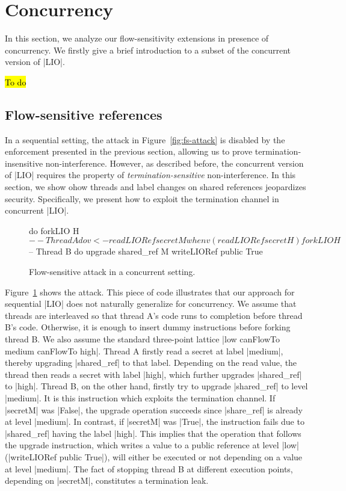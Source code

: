 \section{Concurrency}

In this section, we analyze our flow-sensitivity extensions in presence of
concurrency. We firstly give a brief introduction to a subset of the concurrent
version of |LIO|.

\hl{To do}

\subsection{Flow-sensitive references}
In a sequential setting, the attack in Figure~\ref{fig:fs-attack} is disabled by
the enforcement presented in the previous section, allowing us to prove
termination-insensitive non-interference. However, as described before, the
concurrent version of |LIO| requires the property of
\emph{termination-sensitive} non-interference. In this section, we show ohow
threads and label changes on shared references jeopardizes security.  
Specifically, we present how to exploit the termination channel in concurrent 
|LIO|.

\begin{figure}
\begin{code}
do  forkLIO H $ -- Thread A
       do  v <- readLIORef secretM
          when v (readLIORef secretH)
    forkLIO H $ -- Thread B
       do  upgrade shared_ref M
           writeLIORef public True
\end{code}  
\caption{Flow-sensitive attack in a concurrent setting.\label{fig:fs-conc-attack}}
\end{figure}
Figure~\ref{fig:fs-conc-attack} shows the attack. This piece of code illustrates
that our approach for sequential |LIO| does not naturally generalize for
concurrency.  
We assume that threads are interleaved so that thread A's code runs to
completion before thread B's code. Otherwise, it is enough to insert dummy
instructions before forking thread B. We also assume the standard three-point
lattice |low canFlowTo medium canFlowTo high|. Thread A firstly read a secret at
label |medium|, thereby upgrading |shared_ref| to that label. Depending on the
read value, the thread then reads a secret with label |high|, which further
upgrades |shared_ref| to |high|. Thread B, on the other hand, firstly try to
upgrade |shared_ref| to level |medium|. It is this instruction which exploits
the termination channel. If |secretM| was |False|, the upgrade operation
succeeds since |share_ref| is already at level |medium|. In contrast, if
|secretM| was |True|, the instruction fails due to |shared_ref| having the label
|high|. This implies that the operation that follows the upgrade instruction,
which writes a value to a public reference at level |low| (|writeLIORef public
True|), will either be executed or not depending on a value at level |medium|.
The fact of stopping thread B at different execution points, depending on
|secretM|, constitutes a termination leak. 

